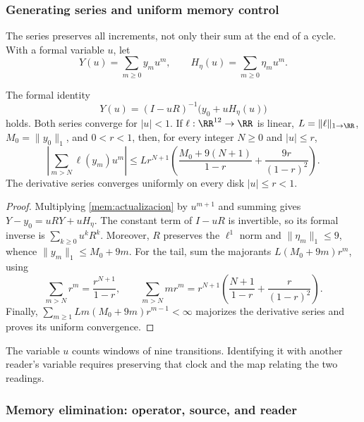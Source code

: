 \subsubsection{Generating series and uniform memory control}

The series preserves all increments, not only their sum at the end of
a cycle. With a formal variable \(u\), let
\[
 Y(u)=\sum_{m\geq0}y_mu^m,\qquad
 H_\eta(u)=\sum_{m\geq0}\eta_mu^m.
\]

\begin{proposition}
\label{mem:prop-serie}
The formal identity
\begin{equation}
 Y(u)=(I-uR)^{-1}\bigl(y_0+uH_\eta(u)\bigr)
 \label{mem:serie}
\end{equation}
holds. Both series converge for \(|u|<1\). If \(\ell:\RR^{12}\to\RR\)
is linear, \(L=\|\ell\|_{1\to\RR}\), \(M_0=\|y_0\|_1\), and
\(0<r<1\), then, for every integer \(N\geq0\) and \(|u|\leq r\),
\begin{equation}
 \left|\sum_{m>N}\ell(y_m)u^m\right|
 \leq Lr^{N+1}\left(
 \frac{M_0+9(N+1)}{1-r}+\frac{9r}{(1-r)^2}\right).
 \label{mem:cota}
\end{equation}
The derivative series converges uniformly on every disk
\(|u|\leq r<1\).
\end{proposition}
\begin{proof}
Multiplying \eqref{mem:actualizacion} by \(u^{m+1}\) and summing gives
\(Y-y_0=uRY+uH_\eta\). The constant term of \(I-uR\) is
invertible, so its formal inverse is \(\sum_{k\geq0}u^kR^k\).
Moreover, \(R\) preserves the \(\ell^1\) norm and
\(\|\eta_m\|_1\leq9\), whence
\(\|y_m\|_1\leq M_0+9m\).
For the tail, sum the majorants
\(L(M_0+9m)r^m\), using
\[
 \sum_{m>N}r^m=\frac{r^{N+1}}{1-r},\qquad
 \sum_{m>N}mr^m=r^{N+1}
 \left(\frac{N+1}{1-r}+\frac r{(1-r)^2}\right).
\]
Finally, \(\sum_{m\geq1}Lm(M_0+9m)r^{m-1}<\infty\)
majorizes the derivative series and proves its uniform convergence.
\end{proof}

The variable \(u\) counts windows of nine transitions. Identifying it
with another reader's variable requires preserving that clock and the
map relating the two readings.

\subsubsection{Memory elimination: operator, source, and reader}

